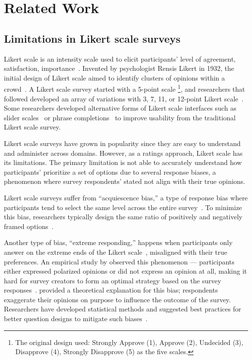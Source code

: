 \section{Related Work} \label{related_works}

\subsection{Limitations in Likert scale surveys}
Likert scale is an intensity scale used to elicit participants' level of agreement, satisfaction, {} importance~\cite{likert1932technique}. Invented by psychologist Rensis Likert in 1932, the initial design of {} Likert scale aimed to identify clusters of opinions within a crowd~\cite{joshi2015likert}. A Likert scale survey started with a 5-point scale \footnote{The original design used: Strongly Approve (1), Approve (2), Undecided (3), Disapprove (4), Strongly Disapprove (5) as the five scales.}, and researchers that followed developed an array of variations with 3, 7, 11, or 12-point Likert scale~\cite{garland2008computer,finstad2010}. Some researchers developed alternative forms of Likert scale interfaces such as slider scales~\cite{roster2015exploring} or phrase completions~\cite{hodge2003phrase} to improve usability from the traditional Likert scale survey. 

Likert scale surveys have grown in popularity since they are easy to understand and administer across domains. However, as a ratings approach, Likert scale has its limitations. The primary limitation is not able to accurately understand how participants' prioritize a set of options due to several response biases, a phenomenon where survey respondents' stated {} not align with their true opinions. 

Likert scale surveys suffer from ``acquiescence bias,'' a type of response bias where participants tend to select the same level across the entire survey~\cite{alwin1985measurement, moors2016two}. To minimize this bias, researchers typically design the same ratio of positively and negatively framed options~\cite{kuru2016improving}. 

Another type of bias, ``extreme responding,'' happens when participants only answer on the extreme ends of the Likert scale~\cite{batchelor2016extreme, furnham1986response, meisenberg2008acquiescent}, misaligned with their true preferences. An empirical study by \textcite{quarfoot2017quadratic} observed this phenomenon --- participants either expressed polarized opinions or did not express an opinion at all, making it hard for survey creators to form an optimal strategy based on the survey responses~\cite{posner2018radical}. \textcite{cavaille2018towards} provided a theoretical explanation for this bias; respondents exaggerate their opinions on purpose to influence the outcome of the survey. Researchers have developed statistical methods and suggested best practices for better question designs to mitigate such biases~\cite{glaser2008response}.

